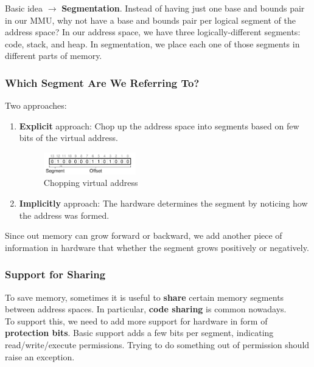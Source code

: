 Basic idea $\rightarrow$ \textbf{Segmentation}. Instead of having just one base
and bounds pair in our MMU, why not have a base and bounds pair per logical
segment of the address space? In our address space, we have three
logically-different segments: code, stack, and heap. In segmentation, we place
each one of those segments in different parts of memory.

\subsubsection{Which Segment Are We Referring To?}

Two approaches:

\begin{enumerate}
    \item \textbf{Explicit} approach: Chop up the address space into segments
        based on few bits of the virtual address.

        \begin{figure}[h!]
            \begin{center}
                \includegraphics[width=4cm]{img/explicit.png}
                \caption{Chopping virtual address}
            \end{center}
        \end{figure}
    \item \textbf{Implicitly} approach: The hardware determines the segment by
        noticing how the address was formed.
\end{enumerate}

Since out memory can grow forward or backward, we add another piece of
information in hardware that whether the segment grows positively or negatively.

\subsubsection{Support for Sharing}

To save memory, sometimes it is useful to \textbf{share} certain memory
segments between address spaces. In particular, \textbf{code sharing} is common
nowadays.\\

To support this, we need to add more support for hardware in form of
\textbf{protection bits}. Basic support adds a few bits per segment, indicating
read/write/execute permissions. Trying to do something out of permission should
raise an exception.

